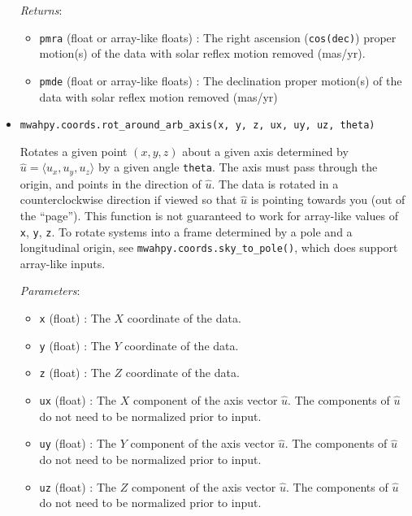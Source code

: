 \documentclass{article}
\begin{document}
\begin{itemize}
\textit{Returns}: \begin{itemize}

\item \verb!pmra! (float or array-like floats) : The right ascension (\verb!cos(dec)!) proper motion(s) of the data with solar reflex motion removed (mas/yr).

\item \verb!pmde! (float or array-like floats) : The declination proper motion(s) of the data with solar reflex motion removed (mas/yr)

\end{itemize}



\item \verb!mwahpy.coords.rot_around_arb_axis(x, y, z, ux, uy, uz, theta)!

Rotates a given point $(x,y,z)$ about a given axis determined by  $\hat{u} = \langle u_x, u_y, u_z \rangle$ by a given angle \verb!theta!. The axis must pass through the origin, and points in the direction of $\hat{u}$. The data is rotated in a counterclockwise direction if viewed so that $\hat{u}$ is pointing towards you (out of the ``page''). This function is not guaranteed to work for array-like values of \verb!x!, \verb!y!, \verb!z!. To rotate systems into a frame determined by a pole and a longitudinal origin, see \verb!mwahpy.coords.sky_to_pole()!, which does support array-like inputs.

\textit{Parameters}: \begin{itemize}

\item \verb!x! (float) : The $X$ coordinate of the data.

\item \verb!y! (float) : The $Y$ coordinate of the data.

\item \verb!z! (float) : The $Z$ coordinate of the data.

\item \verb!ux! (float) : The $X$ component of the axis vector $\hat{u}$. The components of $\hat{u}$ do not need to be normalized prior to input.

\item \verb!uy! (float) : The $Y$ component of the axis vector $\hat{u}$. The components of $\hat{u}$ do not need to be normalized prior to input.

\item \verb!uz! (float) : The $Z$ component of the axis vector $\hat{u}$. The components of $\hat{u}$ do not need to be normalized prior to input.


\end{itemize}
\end{itemize}
\end{document}
